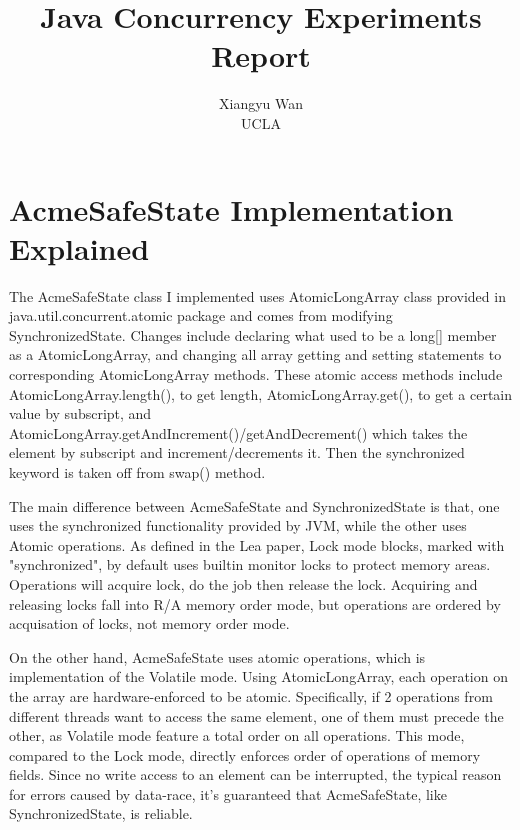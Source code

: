 \documentclass[letterpaper,twocolumn,10pt]{article}
\begin{document}

\date{}

\title{\Large \bf Java Concurrency Experiments Report}

\author{
{\rm Xiangyu Wan}\\
UCLA
} %

\maketitle


\section{AcmeSafeState Implementation Explained}

The AcmeSafeState class I implemented uses AtomicLongArray class provided in java.util.concurrent.atomic package and comes from modifying SynchronizedState. 
Changes include declaring what used to be a long[] member as a AtomicLongArray, and changing all array getting and setting statements to corresponding AtomicLongArray methods.
These atomic access methods include AtomicLongArray.length(), to get length, AtomicLongArray.get(), to get a certain value by subscript, and AtomicLongArray.getAndIncrement()/getAndDecrement() which takes the element by subscript and increment/decrements it.
Then the synchronized keyword is taken off from swap() method.

The main difference between AcmeSafeState and SynchronizedState is that, one uses the synchronized functionality provided by JVM, while the other uses Atomic operations.
As defined in the Lea paper, Lock mode blocks, marked with "synchronized", by default uses builtin monitor locks to protect memory areas.
Operations will acquire lock, do the job then release the lock.
Acquiring and releasing locks fall into R/A memory order mode, but operations are ordered by acquisation of locks, not memory order mode.

On the other hand, AcmeSafeState uses atomic operations, which is implementation of the Volatile mode. 
Using AtomicLongArray, each operation on the array are hardware-enforced to be atomic.
Specifically, if 2 operations from different threads want to access the same element, one of them must precede the other, as Volatile mode feature a total order on all operations.
This mode, compared to the Lock mode, directly enforces order of operations of memory fields.
Since no write access to an element can be interrupted, the typical reason for errors caused by data-race, it's guaranteed that AcmeSafeState, like SynchronizedState, is reliable.
\end{document}
